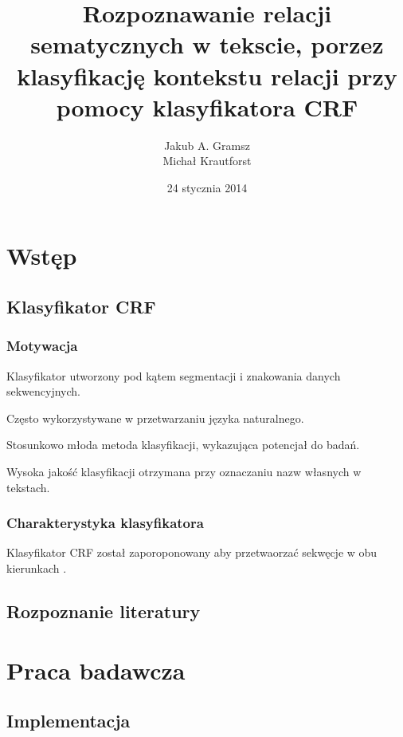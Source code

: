 \documentclass[a4paper,10pt]{report}
\title{Rozpoznawanie relacji sematycznych w tekscie, porzez klasyfikację kontekstu relacji przy pomocy klasyfikatora \textbf{CRF}}
\author{Jakub A. Gramsz \\ Michał Krautforst}
\date{24 stycznia 2014}
\begin{document}
\renewcommand{\figurename}{Wykres}
\renewcommand{\chaptername}{}

\maketitle
\tableofcontents

\chapter{Wstęp} %

\section{Klasyfikator CRF} 

\subsection{Motywacja}

Klasyfikator utworzony pod kątem segmentacji i znakowania danych sekwencyjnych.

Często wykorzystywane w przetwarzaniu języka naturalnego.

Stosunkowo młoda metoda klasyfikacji, wykazująca potencjał do badań.

Wysoka jakość klasyfikacji otrzymana przy oznaczaniu nazw własnych w tekstach.

\subsection{Charakterystyka klasyfikatora}

Klasyfikator CRF został zaporoponowany aby przetwaorzać sekwęcje w obu kierunkach \cite{lafferty2001crf}.

\section{Rozpoznanie literatury}



\chapter{Praca badawcza}

\section{Implementacja}
\end{document}
